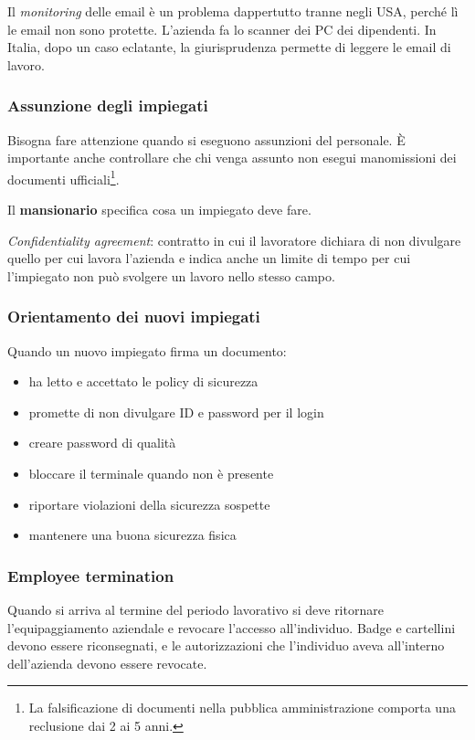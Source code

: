 Il \textit{monitoring} delle email è un problema dappertutto tranne negli USA, 
perché lì le email non sono protette. L'azienda fa lo scanner dei PC dei 
dipendenti. In Italia, dopo un caso eclatante, la giurisprudenza permette di 
leggere le email di lavoro.

\subsubsection{Assunzione degli impiegati}

Bisogna fare attenzione quando si eseguono assunzioni del personale. È 
importante anche controllare che chi venga assunto non esegui manomissioni dei 
documenti ufficiali\footnote{La falsificazione di documenti nella pubblica 
amministrazione comporta una reclusione dai 2 ai 5 anni.}.

Il \textbf{mansionario} specifica cosa un impiegato deve fare.

\textit{Confidentiality agreement}: contratto in cui il lavoratore dichiara di 
non divulgare quello per cui lavora l'azienda e indica anche un limite di tempo 
per cui l'impiegato non può svolgere un lavoro nello stesso campo.


\subsubsection{Orientamento dei nuovi impiegati}


Quando un nuovo impiegato firma un documento:
\begin{itemize}
\item ha letto e accettato le policy di sicurezza
\item promette di non divulgare ID e password per il login
\item creare password di qualità
\item bloccare il terminale quando non è presente
\item riportare violazioni della sicurezza sospette
\item mantenere una buona sicurezza fisica
\end{itemize}

\subsubsection{Employee termination}

Quando si arriva al termine del periodo lavorativo si deve ritornare 
l'equipaggiamento aziendale e revocare l'accesso all'individuo. Badge e 
cartellini devono essere riconsegnati, e le autorizzazioni che l'individuo aveva 
all'interno dell'azienda devono essere revocate.

